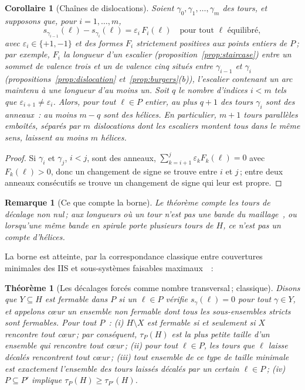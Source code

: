 \documentclass[11pt,a4paper]{article}
\newtheorem{theorem}{Théorème}
\newtheorem{corollary}{Corollaire}
\newtheorem{remark}{Remarque}
\newcommand{\shift}{s}
\begin{document}
\begin{corollary}[Chaînes de dislocations]\label{cor:chain}
Soient $\gamma_0, \gamma_1, \dots, \gamma_m$ des tours, et supposons que,
pour $i = 1, \dots, m$,
\[
  \shift_{\gamma_{i-1}}(\ell) - \shift_{\gamma_i}(\ell) = \varepsilon_i\,
  F_i(\ell) \quad \text{pour tout } \ell \text{ équilibré},
\]
avec $\varepsilon_i \in \{+1, -1\}$ et des formes $F_i$ strictement positives
aux points entiers de $P$\,; par exemple, $F_i$ la longueur d'un escalier
(proposition~\ref{prop:staircase}) entre un sommet de valence trois et un de
valence cinq situés entre $\gamma_{i-1}$ et $\gamma_i$
(propositions~\ref{prop:dislocation} et~\ref{prop:burgers}(b)), l'escalier
contenant un arc maintenu à une longueur d'au moins un. Soit $q$ le nombre
d'indices $i < m$ tels que $\varepsilon_{i+1} \neq \varepsilon_i$. Alors, pour
tout $\ell \in P$ entier, au plus $q + 1$ des tours $\gamma_i$ sont des
anneaux~: au moins $m - q$ sont des hélices. En particulier, $m + 1$ tours
parallèles emboîtés, séparés par $m$ dislocations dont les escaliers montent
tous dans le même sens, laissent au moins $m$ hélices.
\end{corollary}

\begin{proof}
Si $\gamma_i$ et $\gamma_j$, $i < j$, sont des anneaux, $\sum_{k=i+1}^{j}
\varepsilon_k F_k(\ell) = 0$ avec $F_k(\ell) > 0$, donc un changement de
signe se trouve entre $i$ et $j$\,; entre deux anneaux consécutifs se trouve
un changement de signe qui leur est propre.
\end{proof}

\begin{remark}[Ce que compte la borne]
Le théorème compte les tours de décalage non nul\,; aux longueurs où un tour
n'est pas une bande du maillage~\cite[prop.~2]{gardent2026loops}, ou
lorsqu'une même bande en spirale porte plusieurs tours de $H$, ce n'est pas un
compte d'hélices.
\end{remark}

La borne est atteinte, par la correspondance classique entre couvertures
minimales des IIS et sous-systèmes faisables
maximaux~\cite{amaldi2003maxfs,parker1996iis}~:

\begin{theorem}[Les décalages forcés comme nombre transversal\,; classique]\label{thm:transversal}
Disons que $Y \subseteq H$ est \emph{fermable} dans $P$ si un $\ell \in P$
vérifie $\shift_\gamma(\ell) = 0$ pour tout $\gamma \in Y$, et appelons
\emph{cœur} un ensemble non fermable dont tous les sous-ensembles stricts sont
fermables. Pour tout $P$~: (i) $H \setminus X$ est fermable si et seulement si
$X$ rencontre tout cœur\,; par conséquent, $\tau_P(H)$ est la plus petite
taille d'un ensemble qui rencontre tout cœur\,; (ii) pour tout $\ell \in P$,
les tours que $\ell$ laisse décalés rencontrent tout cœur\,; (iii) tout
ensemble de ce type de taille minimale est exactement l'ensemble des tours
laissés décalés par un certain $\ell \in P$\,; (iv) $P \subseteq P'$ implique
$\tau_P(H) \ge \tau_{P'}(H)$.
\end{theorem}
\end{document}
